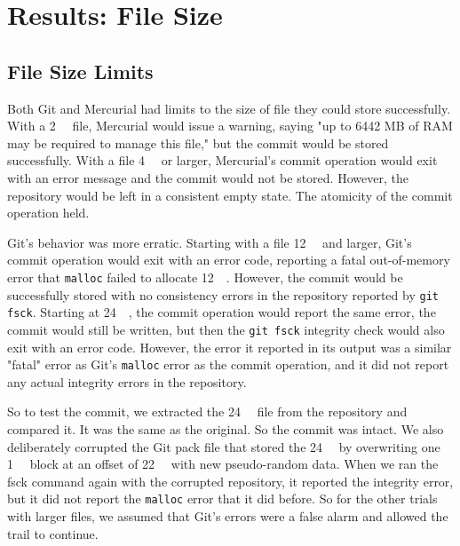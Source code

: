 \section{Results: File Size}

\subsection{File Size Limits}
\label{file-size-limits-results}

Both Git and Mercurial had limits to the size of file they could store
successfully. With a \SI{2}{\gibi\byte} file, Mercurial would issue a warning,
saying "up to 6442 MB of RAM may be required to manage this file," but the
\gls{commit} would be stored successfully. With a file \SI{4}{\gibi\byte} or
larger, Mercurial's \gls{commit} operation would exit with an error message and
the \gls{commit} would not be stored. However, the repository would be left in a
consistent empty state. The atomicity of the \gls{commit} operation held.

Git's behavior was more erratic. Starting with a file \SI{12}{\gibi\byte} and
larger, Git's \gls{commit} operation would exit with an error code, reporting a
fatal out-of-memory error that \lstinline{malloc} failed to allocate
\SI{12}{\gibi\byte}. However, the \gls{commit} would be successfully stored with
no consistency errors in the repository reported by \lstinline{git fsck}.
Starting at \SI{24}{\gibi\byte}, the \gls{commit} operation would report the
same error, the \gls{commit} would still be written, but then the 
\lstinline{git fsck} integrity check would also exit with an error code.
However, the error it reported in its output was a similar "fatal" error as
Git's \lstinline{malloc} error as the \gls{commit} operation, and it did not
report any actual integrity errors in the repository.

So to test the \gls{commit}, we extracted the \SI{24}{\gibi\byte} file from the
repository and compared it. It was the same as the original. So the \gls{commit}
was intact. We also deliberately corrupted the Git pack file that stored the
\SI{24}{\gibi\byte} by overwriting one \SI{1}{\mebi\byte} block at an offset of
\SI{22}{\gibi\byte} with new pseudo-random data. When we ran the fsck command
again with the corrupted repository, it reported the integrity error, but it did
not report the \lstinline{malloc} error that it did before. So for the other
trials with larger files, we assumed that Git's errors were a false alarm and
allowed the trail to continue.

